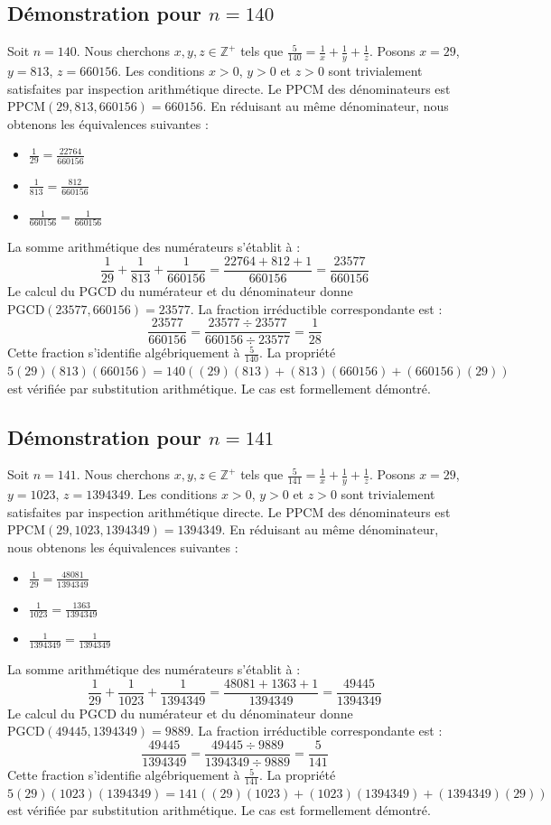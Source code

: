 \documentclass[12pt,a4paper]{article}
\begin{document}
\subsection{Démonstration pour $n = 140$}
Soit $n = 140$. Nous cherchons $x, y, z \in \mathbb{Z}^{+}$ tels que $\frac{5}{140} = \frac{1}{x} + \frac{1}{y} + \frac{1}{z}$.
Posons $x = 29$, $y = 813$, $z = 660156$.
Les conditions $x > 0$, $y > 0$ et $z > 0$ sont trivialement satisfaites par inspection arithmétique directe.
Le PPCM des dénominateurs est $\text{PPCM}(29, 813, 660156) = 660156$.
En réduisant au même dénominateur, nous obtenons les équivalences suivantes :
\begin{itemize}
    \item $\frac{1}{29} = \frac{22764}{660156}$
    \item $\frac{1}{813} = \frac{812}{660156}$
    \item $\frac{1}{660156} = \frac{1}{660156}$
\end{itemize}
La somme arithmétique des numérateurs s'établit à :
$$ \frac{1}{29} + \frac{1}{813} + \frac{1}{660156} = \frac{22764 + 812 + 1}{660156} = \frac{23577}{660156} $$
Le calcul du PGCD du numérateur et du dénominateur donne $\text{PGCD}(23577, 660156) = 23577$.
La fraction irréductible correspondante est :
$$ \frac{23577}{660156} = \frac{23577 \div 23577}{660156 \div 23577} = \frac{1}{28} $$
Cette fraction s'identifie algébriquement à $\frac{5}{140}$.
La propriété $5(29)(813)(660156) = 140((29)(813) + (813)(660156) + (660156)(29))$ est vérifiée par substitution arithmétique.
Le cas est formellement démontré.

\subsection{Démonstration pour $n = 141$}
Soit $n = 141$. Nous cherchons $x, y, z \in \mathbb{Z}^{+}$ tels que $\frac{5}{141} = \frac{1}{x} + \frac{1}{y} + \frac{1}{z}$.
Posons $x = 29$, $y = 1023$, $z = 1394349$.
Les conditions $x > 0$, $y > 0$ et $z > 0$ sont trivialement satisfaites par inspection arithmétique directe.
Le PPCM des dénominateurs est $\text{PPCM}(29, 1023, 1394349) = 1394349$.
En réduisant au même dénominateur, nous obtenons les équivalences suivantes :
\begin{itemize}
    \item $\frac{1}{29} = \frac{48081}{1394349}$
    \item $\frac{1}{1023} = \frac{1363}{1394349}$
    \item $\frac{1}{1394349} = \frac{1}{1394349}$
\end{itemize}
La somme arithmétique des numérateurs s'établit à :
$$ \frac{1}{29} + \frac{1}{1023} + \frac{1}{1394349} = \frac{48081 + 1363 + 1}{1394349} = \frac{49445}{1394349} $$
Le calcul du PGCD du numérateur et du dénominateur donne $\text{PGCD}(49445, 1394349) = 9889$.
La fraction irréductible correspondante est :
$$ \frac{49445}{1394349} = \frac{49445 \div 9889}{1394349 \div 9889} = \frac{5}{141} $$
Cette fraction s'identifie algébriquement à $\frac{5}{141}$.
La propriété $5(29)(1023)(1394349) = 141((29)(1023) + (1023)(1394349) + (1394349)(29))$ est vérifiée par substitution arithmétique.
Le cas est formellement démontré.
\end{document}
